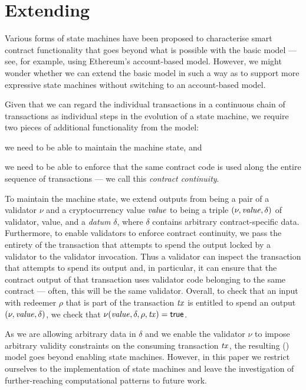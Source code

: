 \section{Extending \UTXO}
\label{sec:informal-eutxo}

Various forms of state machines have been proposed to characterise smart contract functionality that goes beyond what is possible with the basic \UTXO{} model --- see, for example, \cite{fsolidm,scilla} using Ethereum's account-based model. However, we might wonder whether we can extend the basic \UTXO{} model in such a way as to support more expressive state machines without switching to an account-based model. 

Given that we can regard the individual transactions in a continuous chain of transactions as individual steps in the evolution of a state machine, we require two pieces of additional functionality from the \UTXO{} model: 
\begin{inparaenum}[(a)]
\item we need to be able to maintain the machine state, and 
\item we need to be able to enforce that the same contract code is used along the entire sequence of transactions --- we call this \emph{contract continuity}.
\end{inparaenum}

To maintain the machine state, we extend \UTXO{} outputs from being a
pair of a validator $\nu$ and a cryptocurrency value $\mathit{value}$ to being a
triple \((\nu, \mathit{value}, \delta)\) of validator, value, and a
\textit{datum} $\delta$, where $\delta$ contains arbitrary
contract-specific data. Furthermore, to enable validators to enforce
contract continuity, we pass the entirety of the transaction that
attempts to spend the output locked by a validator to the validator
invocation. Thus a validator can inspect the transaction that
attempts to spend its output and, in particular, it can ensure that the
contract output of that transaction uses validator code belonging to
the same contract --- often, this will be the same validator. Overall,
to check that an input with redeemer $\rho$ that is part of the
transaction $\mathit{tx}$ is entitled to spend an output \((\nu, \mathit{value},
\delta)\), we check that \(\nu(\mathit{value}, \delta, \rho, \mathit{tx}) = \textsf{true}\).

As we are allowing arbitrary data in $\delta$ and we enable the validator
$\nu$ to impose arbitrary validity constraints on the consuming
transaction $\mathit{tx}$, the resulting \ExUTXO{} (\EUTXO{}) model goes
beyond enabling state machines. However, in this paper we restrict
ourselves to the implementation of state machines and leave the
investigation of further-reaching computational patterns to future
work.

